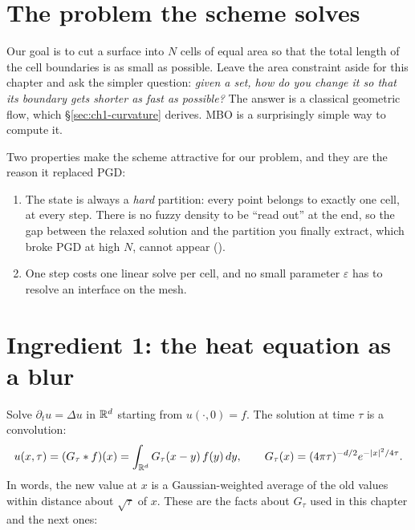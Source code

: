 \section{The problem the scheme solves}
\label{sec:ch1-problem}

Our goal is to cut a surface into $N$ cells of equal area so that the total
length of the cell boundaries is as small as possible. Leave the area
constraint aside for this chapter and ask the simpler question:
\emph{given a set, how do you change it so that its boundary gets shorter as
fast as possible?} The answer is a classical geometric flow, which
\S\ref{sec:ch1-curvature} derives. MBO is a surprisingly simple way to compute
it.

Two properties make the scheme attractive for our problem, and they are the
reason it replaced PGD:
\begin{enumerate}[nosep]
  \item The state is always a \emph{hard} partition: every point belongs to
        exactly one cell, at every step. There is no fuzzy density to be
        ``read out'' at the end, so the gap between the relaxed solution and
        the partition you finally extract, which broke PGD at high $N$, cannot
        appear ().
  \item One step costs one linear solve per cell, and no small parameter
        $\varepsilon$ has to resolve an interface on the mesh.
\end{enumerate}

\section{Ingredient 1: the heat equation as a blur}
\label{sec:ch1-heat}

Solve $\partial_t u = \Delta u$ in $\mathbb{R}^d$ starting from $u(\cdot, 0) = f$. The
solution at time $\tau$ is a convolution:
\begin{equation}
  u(x, \tau) = (G_\tau * f)(x) = \int_{\mathbb{R}^d} G_\tau(x - y)\, f(y)\, dy,
  \qquad
  G_\tau(x) = (4\pi\tau)^{-d/2} e^{-|x|^2/4\tau}.
  \label{eq:ch1-heat}
\end{equation}
In words, the new value at $x$ is a Gaussian-weighted average of the old values
within distance about $\sqrt\tau$ of $x$. These are the facts about $G_\tau$
used in this chapter and the next ones:

